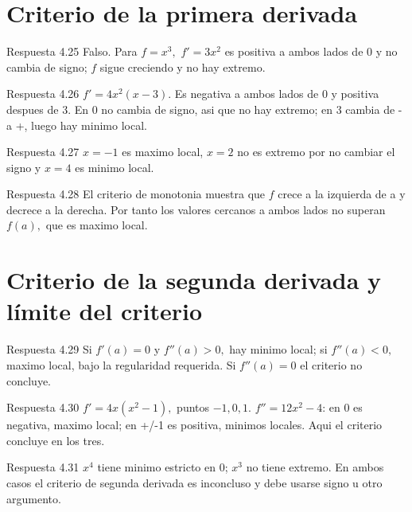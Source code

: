 \documentclass[10pt,a4paper,oneside,openany]{book}
\begin{document}
\section{Criterio de la primera derivada}
\begin{PSevenAnswerFixed}{Respuesta 4.25}
Falso. Para \(f=x^{3},\) \(f'=3x^{2}\) es positiva a ambos lados de \(0\) y no cambia de signo; \(f\) sigue creciendo y no hay extremo.
\end{PSevenAnswerFixed}
\begin{PSevenAnswerFixed}{Respuesta 4.26}
\(f'=4x^{2}(x-3)\). Es negativa a ambos lados de \(0\) y positiva despues de \(3\). En \(0\) no cambia de signo, asi que no hay extremo; en \(3\) cambia de - a +, luego hay minimo local.
\end{PSevenAnswerFixed}
\begin{PSevenAnswerFixed}{Respuesta 4.27}
\(x=-1\) es maximo local, \(x=2\) no es extremo por no cambiar el signo y \(x=4\) es minimo local.
\end{PSevenAnswerFixed}
\begin{PSevenAnswerFixed}{Respuesta 4.28}
El criterio de monotonia muestra que \(f\) crece a la izquierda de a y decrece a la derecha. Por tanto los valores cercanos a ambos lados no superan \(f(a),\) que es maximo local.
\end{PSevenAnswerFixed}
\section{Criterio de la segunda derivada y límite del criterio}
\begin{PSevenAnswerFixed}{Respuesta 4.29}
Si \(f'(a)=0\) y \(f''(a)>0,\) hay minimo local; si \(f''(a)<0,\) maximo local, bajo la regularidad requerida. Si \(f''(a)=0\) el criterio no concluye.
\end{PSevenAnswerFixed}
\begin{PSevenAnswerFixed}{Respuesta 4.30}
\(f'=4x(x^{2}-1),\) puntos \(-1,0,1\). \(f''=12x^{2}-4\): en \(0\) es negativa, maximo local; en +/-1 es positiva, minimos locales. Aqui el criterio concluye en los tres.
\end{PSevenAnswerFixed}
\begin{PSevenAnswerFixed}{Respuesta 4.31}
\(x^{4}\) tiene minimo estricto en \(0\); \(x^{3}\) no tiene extremo. En ambos casos el criterio de segunda derivada es inconcluso y debe usarse signo u otro argumento.
\end{PSevenAnswerFixed}
\end{document}
